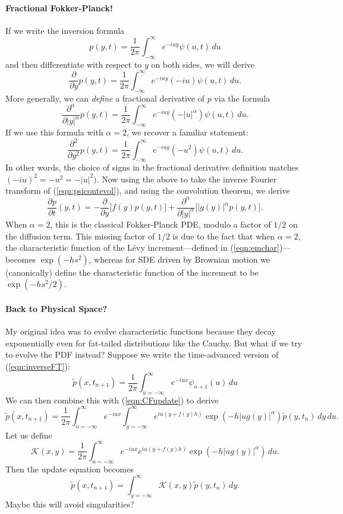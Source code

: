 \documentclass[11pt,letterpaper]{article}
\begin{document}
\paragraph{Fractional Fokker-Planck!}  If we write the inversion formula
\[
p(y,t) = \frac{1}{2 \pi} \int_{-\infty}^\infty e^{-i u y} \psi(u,t) \, du
\]
and then differentiate with respect to $y$ on both sides, we will derive
\[
\frac{\partial}{\partial y} p(y,t) = \frac{1}{2 \pi} \int_{-\infty}^\infty e^{-i u y} (-i u) \psi(u,t) \, du.
\]
More generally, we can \emph{define} a fractional derivative of $p$ via the formula
\[
\frac{\partial^\alpha }{\partial |y|^\alpha} p(y,t) = \frac{1}{2 \pi} \int_{-\infty}^\infty e^{-i u y} (- |u|^\alpha ) \psi(u,t) \, du.
\]
If we use this formula with $\alpha=2$, we recover a familiar statement:
\[
\frac{\partial^2}{\partial y^2} p(y,t) = \frac{1}{2 \pi} \int_{-\infty}^\infty e^{- i u y} (-u^2) \psi(u,t) \, du.
\]
In other words, the choice of signs in the fractional derivative definition matches $(-i u)^2 = -u^2 = -|u|^2)$.
Now using the above to take the inverse Fourier transform of (\ref{eqn:psicontevol}), and using the convolution theorem, we derive
\begin{equation}
\label{eqn:fracfp}
\frac{\partial p}{\partial t}(y,t) = -\frac{\partial}{\partial y} \bigl[ f(y) p(y,t) \bigr] + \frac{\partial^\alpha}{\partial |y|^\alpha} \bigl[ |g(y)|^\alpha p(y,t) \bigr].
\end{equation}
When $\alpha=2$, this is the classical Fokker-Planck PDE, modulo a factor of $1/2$ on the diffusion term.  This missing factor of $1/2$ is due to the fact that when $\alpha=2$, the characteristic function of the L\'{e}vy increment---defined in (\ref{eqn:emchar})---becomes $\exp(-h s^2)$, whereas for SDE driven by Brownian motion we (canonically) define the characteristic function of the increment to be $\exp(-h s^2/2)$.

\paragraph{Back to Physical Space?} My original idea was to evolve characteristic functions because they decay exponentially even for fat-tailed distributions like the Cauchy.  But what if we try to evolve the PDF instead?  Suppose we write the time-advanced version of (\ref{eqn:inverseFT}):
\[
\widetilde{p}(x, t_{n+1}) = \frac{1}{2\pi}\int_{u=-\infty}^{\infty}e^{-iux}\psi_{n+1}(u)\, du
\]
We can then combine this with (\ref{eqn:CFupdate}) to derive
\[
\widetilde{p}(x, t_{n+1}) = \frac{1}{2 \pi} \int_{u=-\infty}^\infty e^{-i u x} 
\int_{y=-\infty}^{\infty}e^{iu\left(y+f(y)h\right)}\exp{\left(  -h |u g(y)|^{\alpha} \right)}\widetilde{p}(y, t_n) \, dy \, du.
\]
Let us define
\[
\mathcal{K}(x,y) = \frac{1}{2 \pi} \int_{u=-\infty}^\infty e^{-i u x} e^{iu\left(y+f(y)h\right)}\exp{\left(  -h |u g(y)|^{\alpha} \right)} \, du.
\]
Then the update equation becomes
\[
\widetilde{p}(x,t_{n+1}) = \int_{y=-\infty}^\infty \mathcal{K}(x,y) \widetilde{p}(y, t_n) \, dy.
\]
Maybe this will avoid singularities?
\end{document}
